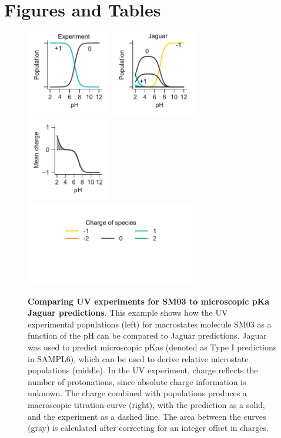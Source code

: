 \documentclass[9pt,lineno,final]{elife}
\begin{document}
\section{Figures and Tables}

\begin{figure}[H]
	\centering
	\includegraphics[width=0.33\textwidth]{Reports/Experiment-populations-SM03-titled.pdf}
	\includegraphics[width=0.33\textwidth]{Reports/Jaguar-TypeI-populations-SM03-titled.pdf}
	\includegraphics[width=0.33\textwidth]{Reports/Jaguar-TypeI-virtual-titration-SM03.pdf}\\
	\includegraphics[width=0.66\textwidth, trim={0 2cm 0 1cm},clip]{Reports/overview-charge-legend-2.pdf}
		\caption{{\bf Comparing UV experiments for SM03 to microscopic pKa Jaguar predictions}. This example shows how the UV experimental populations (left) for macrostates molecule SM03 as a function of the pH can be compared to Jaguar predictions. Jaguar was used to predict microscopic pKas (denoted as Type I predictions in SAMPL6), which can be used to derive relative microstate populations (middle). In the UV experiment, charge reflects the number of protonations, since absolute charge information is unknown. The charge combined with populations produces a macroscopic titration curve (right), with the prediction as a solid, and the experiment as a dashed line. The area between the curves (gray) is calculated after correcting for an integer offset in charges.
}
\end{figure}
\end{document}
